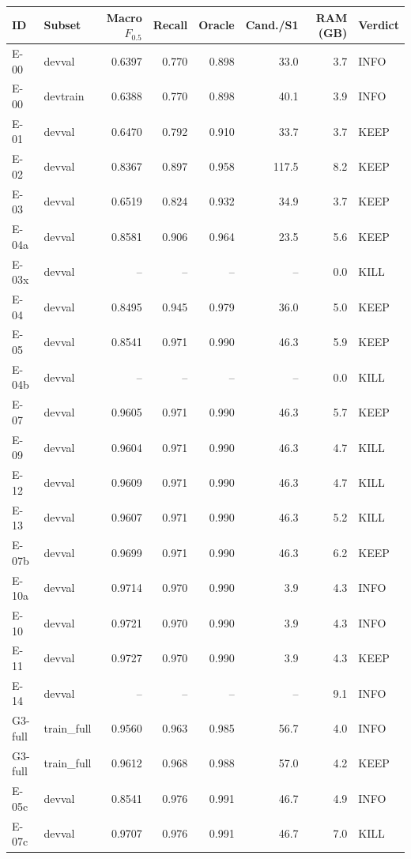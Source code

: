 \documentclass[10pt]{article}
\newcommand{\Fh}{F_{0.5}}
\begin{document}
\begin{center}\small
\begin{tabular}{@{}llrrrrrl@{}}
\toprule
ID & Subset & Macro $\Fh$ & Recall & Oracle & Cand./S1 & RAM (GB) & Verdict \\
\midrule
E-00 & devval & 0.6397 & 0.770 & 0.898 & 33.0 & 3.7 & INFO \\
E-00 & devtrain & 0.6388 & 0.770 & 0.898 & 40.1 & 3.9 & INFO \\
E-01 & devval & 0.6470 & 0.792 & 0.910 & 33.7 & 3.7 & KEEP \\
E-02 & devval & 0.8367 & 0.897 & 0.958 & 117.5 & 8.2 & KEEP \\
E-03 & devval & 0.6519 & 0.824 & 0.932 & 34.9 & 3.7 & KEEP \\
E-04a & devval & 0.8581 & 0.906 & 0.964 & 23.5 & 5.6 & KEEP \\
E-03x & devval & -- & -- & -- & -- & 0.0 & KILL \\
E-04 & devval & 0.8495 & 0.945 & 0.979 & 36.0 & 5.0 & KEEP \\
E-05 & devval & 0.8541 & 0.971 & 0.990 & 46.3 & 5.9 & KEEP \\
E-04b & devval & -- & -- & -- & -- & 0.0 & KILL \\
E-07 & devval & 0.9605 & 0.971 & 0.990 & 46.3 & 5.7 & KEEP \\
E-09 & devval & 0.9604 & 0.971 & 0.990 & 46.3 & 4.7 & KILL \\
E-12 & devval & 0.9609 & 0.971 & 0.990 & 46.3 & 4.7 & KILL \\
E-13 & devval & 0.9607 & 0.971 & 0.990 & 46.3 & 5.2 & KILL \\
E-07b & devval & 0.9699 & 0.971 & 0.990 & 46.3 & 6.2 & KEEP \\
E-10a & devval & 0.9714 & 0.970 & 0.990 & 3.9 & 4.3 & INFO \\
E-10 & devval & 0.9721 & 0.970 & 0.990 & 3.9 & 4.3 & INFO \\
E-11 & devval & 0.9727 & 0.970 & 0.990 & 3.9 & 4.3 & KEEP \\
E-14 & devval & -- & -- & -- & -- & 9.1 & INFO \\
G3-full & train\_full & 0.9560 & 0.963 & 0.985 & 56.7 & 4.0 & INFO \\
G3-full & train\_full & 0.9612 & 0.968 & 0.988 & 57.0 & 4.2 & KEEP \\
E-05c & devval & 0.8541 & 0.976 & 0.991 & 46.7 & 4.9 & INFO \\
E-07c & devval & 0.9707 & 0.976 & 0.991 & 46.7 & 7.0 & KILL \\

\end{tabular}
\end{center}
\end{document}
